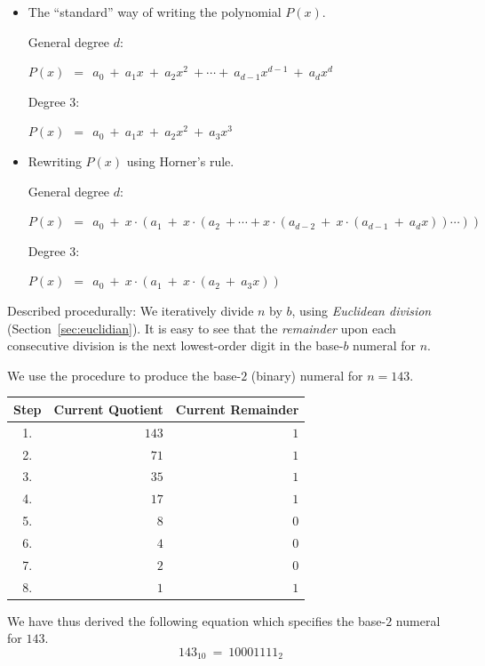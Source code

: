 \begin{itemize}
\item {\small\sf The ``standard'' way of writing the polynomial $P(x)$.}

\noindent General degree $d$:

$P(x) \ \ = \ \ a_0 \ + \ a_1 x \ + \ a_2 x^2 \ + \cdots + \ a_{d-1}
x^{d-1} \ + \ a_d x^d$

\noindent Degree $3$:

$P(x) \ \ = \ \ a_0 \ + \ a_1 x \ + \ a_2 x^2 \ + \ a_3 x^3$

\item {\small\sf Rewriting $P(x)$ using Horner's rule.}

\noindent General degree $d$:

$P(x) \ \ = \ \ a_0 \ + \ x \cdot (a_1 \ + \ x \cdot (a_2  \ +  \cdots
+ x \cdot (a_{d-2} \ + \ x \cdot (a_{d-1} \ + \ a_d x)) \cdots ))$  

\noindent Degree $3$:

$P(x) \ \ = \ \ a_0 \ + \ x \cdot (a_1 \ + \ x \cdot (a_2  \ + \ a_3 x))$ 
\end{itemize}

\noindent
Described procedurally: We iteratively divide $n$ by $b$, using {\it
  Euclidean division} (Section~\ref{sec:euclidian}).  It is easy to
see that the {\em remainder} upon each consecutive division is the
next lowest-order digit in the base-$b$ numeral for $n$.

\bigskip

We use the procedure to produce the base-$2$ (binary) numeral for $n =
143$.

\medskip

\begin{tabular}{|c|r|r|}
\hline
Step &
Current Quotient &
Current Remainder \\
\hline
1. & $143$ & $1$ \\
2. & $71$  & $1$ \\
3. & $35$  & $1$ \\
4. & $17$  & $1$ \\
5. & $8$   & $0$ \\
6. & $4$   & $0$ \\
7. & $2$   & $0$ \\
8. & $1$   & $1$ \\
\hline
\end{tabular}

\medskip

\noindent
We have thus derived the following equation which specifies the
base-$2$ numeral for $143$.
\[ 143_{10} \ = \ 10001111_2 \]

